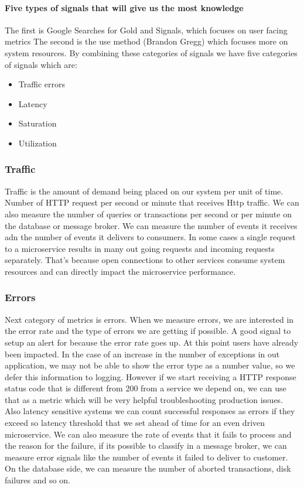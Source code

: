 \paragraph{Five types of signals that will give us the most knowledge}
The first is Google Searches for Gold and Signals, which focuses on user facing metrics
The second is the use method (Brandon Gregg) which focuses more on system resources.
By combining these categories of signals we have five categories of signals which are:

\begin{itemize}
    \item Traffic errors
    \item Latency
    \item Saturation
    \item Utilization
\end{itemize}

\subsubsection{Traffic}
Traffic is the amount of demand being placed on our system per unit of time.
Number of HTTP request per second or minute that receives Http traffic.
We can also measure the number of queries or transactions per second or per minute on the database or message broker.
We can measure the number of events it receives adn the number of events it delivers to consumers.
In some cases a single request to a microservice results in many out going requests and incoming requests separately.
That's because open connections to other services consume system resources and can directly impact the microservice performance.

\subsubsection{Errors}
Next category of metrics is errors.
When we measure errors, we are interested in the error rate and the type of errors we are getting if possible.
A good signal to setup an alert for because the error rate goes up.
At this point users have already been impacted.
In the case of an increase in the number of exceptions in out application, we may not be able to show the error type as a number value, so we defer this information to logging.
However if we start receiving a HTTP response status code that is different from 200 from a service we depend on, we can use that as a metric which will be very helpful troubleshooting production issues.
Also latency sensitive systems we can count successful responses as errors if they exceed so latency threshold that we set ahead of time for an even driven microservice.
We can also measure the rate of events that it fails to process and the reason for the failure, if its possible to classify in a message broker, we can measure error signals like the number of events it failed to deliver to customer.
On the database side, we can measure the number of aborted transactions, disk failures and so on.

